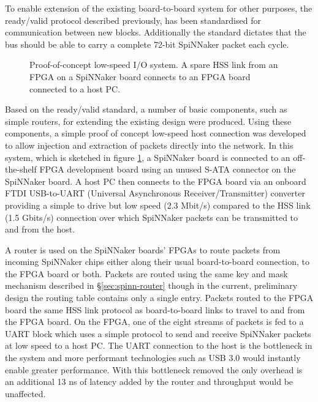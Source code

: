 				To enable extension of the existing board-to-board system for other
				purposes, the ready/valid protocol described previously, has been
				standardised for communication between new blocks. Additionally the
				standard dictates that the bus should be able to carry a complete 72-bit
				SpiNNaker packet each cycle.
				
				\begin{figure}
					\center
					
					
					\caption[Proof-of-concept low-speed I/O system.]{Proof-of-concept
					low-speed I/O system. A spare HSS link from an FPGA on a SpiNNaker
					board connects to an FPGA board connected to a host PC.}
					\label{fig:proof-of-concept-fpga-links}
				\end{figure}
				
				Based on the ready/valid standard, a number of basic components, such as
				simple routers, for extending the existing design were produced. Using
				these components, a simple proof of concept low-speed host connection
				was developed to allow injection and extraction of packets directly into
				the network. In this system, which is sketched in figure
				\ref{fig:proof-of-concept-fpga-links}, a SpiNNaker board is connected to
				an off-the-shelf FPGA development board
				\cite{raggedstone2} using an unused S-ATA connector on the SpiNNaker
				board. A host PC then connects to the FPGA board via an onboard FTDI
				USB-to-UART (Universal Asynchronous Receiver/Transmitter) converter
				providing a simple to drive but low speed (2.3 Mbit/s) compared to the
				HSS link (1.5 Gbits/s) connection over which SpiNNaker packets can be
				transmitted to and from the host.
				
				A router is used on the SpiNNaker boards' FPGAs to route packets from
				incoming SpiNNaker chips either along their usual board-to-board
				connection, to the FPGA board or both.  Packets are routed using the
				same key and mask mechanism described in \S\ref{sec:spinn-router} though
				in the current, preliminary design the routing table contains only a
				single entry.  Packets routed to the FPGA board the same HSS link
				protocol as board-to-board links to travel to and from the FPGA board.
				On the FPGA, one of the eight streams of packets is fed to a UART block
				which uses a simple protocol to send and receive SpiNNaker packets at
				low speed to a host PC. The UART connection to the host is the
				bottleneck in the system and more performant technologies such as USB
				3.0 would instantly enable greater performance. With this bottleneck
				removed the only overhead is an additional 13 ns of latency added by the
				router and throughput would be unaffected.
				
